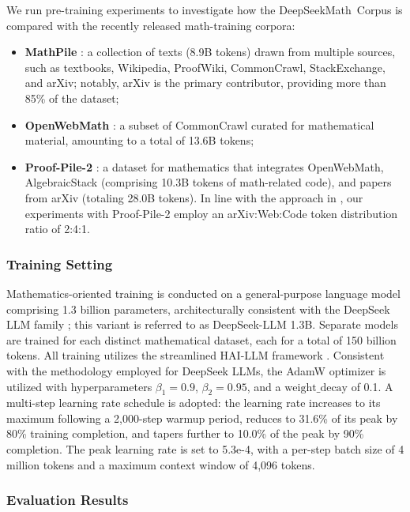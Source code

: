 \begin{itemize}[topsep=0pt]
We run pre-training experiments to investigate how the DeepSeekMath~Corpus is compared with the recently released math-training corpora:

\begin{itemize}[topsep=0pt]
    \item \textbf{MathPile} \citep{mathpile}: a collection of texts (8.9B tokens) drawn from multiple sources, such as textbooks, Wikipedia, ProofWiki, CommonCrawl, StackExchange, and arXiv; notably, arXiv is the primary contributor, providing more than 85\% of the dataset;
    \item \textbf{OpenWebMath} \citep{openwebmath}: a subset of CommonCrawl curated for mathematical material, amounting to a total of 13.6B tokens;
    \item \textbf{Proof-Pile-2} \citep{llemma}: a dataset for mathematics that integrates OpenWebMath, AlgebraicStack (comprising 10.3B tokens of math-related code), and papers from arXiv (totaling 28.0B tokens). In line with the approach in \cite{llemma}, our experiments with Proof-Pile-2 employ an arXiv:Web:Code token distribution ratio of 2:4:1.
\end{itemize}

\subsubsection{Training Setting}
\label{sec:quality-policy}
Mathematics-oriented training is conducted on a general-purpose language model comprising 1.3 billion parameters, architecturally consistent with the DeepSeek LLM family \citep{deepseek-llm}; this variant is referred to as DeepSeek-LLM 1.3B. Separate models are trained for each distinct mathematical dataset, each for a total of 150 billion tokens. All training utilizes the streamlined HAI-LLM framework \citep{haillm}. Consistent with the methodology employed for DeepSeek LLMs, the AdamW optimizer \citep{adamW} is utilized with hyperparameters $\beta_1=0.9$, $\beta_2=0.95$, and a $\mathrm{weight\_decay}$ of 0.1. A multi-step learning rate schedule is adopted: the learning rate increases to its maximum following a 2,000-step warmup period, reduces to 31.6\% of its peak by 80\% training completion, and tapers further to 10.0\% of the peak by 90\% completion. The peak learning rate is set to 5.3e-4, with a per-step batch size of 4 million tokens and a maximum context window of 4,096 tokens.

\subsubsection{Evaluation Results}


\end{itemize}
